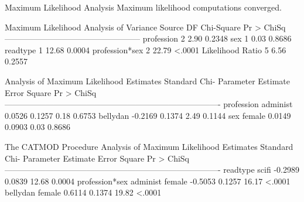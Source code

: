 \documentclass{article}
\begin{document}
\begin{Woutput}
                   Maximum Likelihood Analysis
           Maximum likelihood computations converged.

     Maximum Likelihood Analysis of Variance
Source               DF   Chi-Square    Pr > ChiSq
--------------------------------------------------
profession            2         2.90        0.2348
sex                   1         0.03        0.8686
readtype              1        12.68        0.0004
profession*sex        2        22.79        <.0001
Likelihood Ratio      5         6.56        0.2557

                   Analysis of Maximum Likelihood Estimates
                                             Standard        Chi-
Parameter                         Estimate      Error      Square    Pr > ChiSq
-------------------------------------------------------------------------------
profession     administ             0.0526     0.1257        0.18        0.6753
               bellydan            -0.2169     0.1374        2.49        0.1144
sex            female               0.0149     0.0903        0.03        0.8686

The CATMOD Procedure
                   Analysis of Maximum Likelihood Estimates
                                             Standard        Chi-
Parameter                         Estimate      Error      Square    Pr > ChiSq
-------------------------------------------------------------------------------
readtype       scifi               -0.2989     0.0839       12.68        0.0004
profession*sex administ female     -0.5053     0.1257       16.17        <.0001
               bellydan female      0.6114     0.1374       19.82        <.0001
\end{Woutput}
\end{document}
